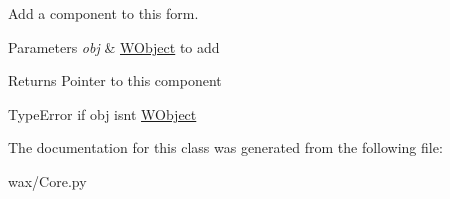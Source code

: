 Add a component to this form. 


\begin{DoxyParams}{Parameters}
{\em obj} & \hyperlink{classwax_1_1Core_1_1WObject}{W\+Object} to add \\
\hline
\end{DoxyParams}
\begin{DoxyReturn}{Returns}
Pointer to this component
\end{DoxyReturn}
Type\+Error if obj isn\textquotesingle{}t \hyperlink{classwax_1_1Core_1_1WObject}{W\+Object} 

The documentation for this class was generated from the following file\+:\begin{DoxyCompactItemize}
\item 
wax/Core.\+py\end{DoxyCompactItemize}
